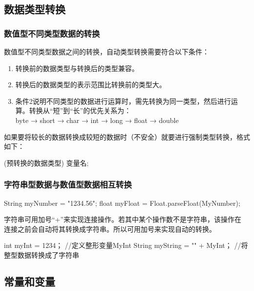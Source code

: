 \subsection{数据类型转换}

\subsubsection{数值型不同类型数据的转换}

数值型不同类型数据之间的转换，{\hei 自动类型转换}需要符合以下条件：

\begin{enumerate}
\item 转换前的数据类型与转换后的类型兼容。
\item 转换后的数据类型的表示范围比转换前的类型大。
\item 条件2说明不同类型的数据进行运算时，需先转换为同一类型，然后进行运算。转换从“短”到“长”的优先关系为：\\
  byte → short → char → int → long → float → double
\end{enumerate}

如果要将较长的数据转换成较短的数据时（不安全）就要进行{\hei 强制类型转换}，格式如下：

\begin{javaCode}
  (预转换的数据类型) 变量名;
\end{javaCode}

\subsubsection{字符串型数据与数值型数据相互转换}


\begin{javaCode}
  String myNumber = "1234.56";
  float myFloat = Float.parseFloat(MyNumber);
\end{javaCode}

字符串可用加号“+”来实现连接操作。若其中某个操作数不是字符串，该操作在
连接之前会自动将其转换成字符串。所以可用加号来实现自动的转换。


\begin{javaCode}
  int myInt = 1234；               //定义整形变量MyInt
  String myString = "" + MyInt；    //将整型数据转换成了字符串 
\end{javaCode}

\subsection{常量和变量}



